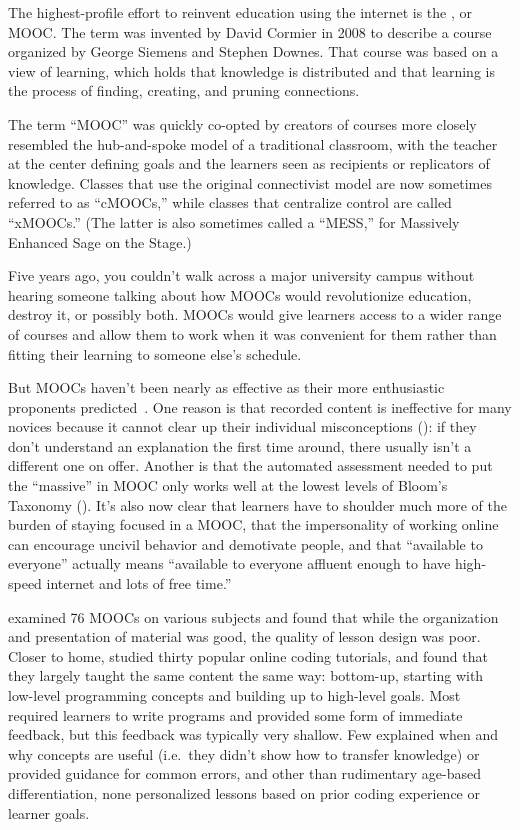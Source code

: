 The highest-profile effort to reinvent education using the internet
is the , or MOOC.
The term was invented by David Cormier in 2008
to describe a course organized by George Siemens
and Stephen Downes.
That course was based on a  view of learning,
which holds that knowledge is distributed
and that learning is the process of finding, creating, and pruning connections.

The term ``MOOC'' was quickly co-opted by creators of
courses more closely resembled the hub-and-spoke model of a traditional classroom,
with the teacher at the center defining goals
and the learners seen as recipients or replicators of knowledge.
Classes that use the original connectivist model are now sometimes referred to as ``cMOOCs,''
while classes that centralize control are called ``xMOOCs.''
(The latter is also sometimes called a ``MESS,''
for Massively Enhanced Sage on the Stage.)

Five years ago,
you couldn't walk across a major university campus
without hearing someone talking about how MOOCs would revolutionize education,
destroy it,
or possibly both.
MOOCs would give learners access to a wider range of courses
and allow them to work when it was convenient for them
rather than fitting their learning to someone else's schedule.

But MOOCs haven't been nearly as effective
as their more enthusiastic proponents predicted~\cite{Ubel2017}.
One reason is that
recorded content is ineffective for many novices
because it cannot clear up their individual misconceptions ():
if they don't understand an explanation the first time around,
there usually isn't a different one on offer.
Another is that the automated assessment needed to put the ``massive'' in MOOC
only works well at the lowest levels of Bloom's Taxonomy ().
It's also now clear that
learners have to shoulder much more of the burden of staying focused in a MOOC,
that the impersonality of working online can encourage uncivil behavior and demotivate people,
and that ``available to everyone'' actually means
``available to everyone affluent enough to have high-speed internet and lots of free time.''

\cite{Marg2015} examined 76 MOOCs on various subjects and found that
while the organization and presentation of material was good,
the quality of lesson design was poor.
Closer to home,
\cite{Kim2017} studied thirty popular online coding tutorials,
and found that they largely taught the same content the same way:
bottom-up,
starting with low-level programming concepts and building up to high-level goals.
Most required learners to write programs and provided some form of immediate feedback,
but this feedback was typically very shallow.
Few explained when and why concepts are useful
(i.e.\ they didn't show how to transfer knowledge)
or provided guidance for common errors,
and other than rudimentary age-based differentiation,
none personalized lessons based on prior coding experience or learner goals.

